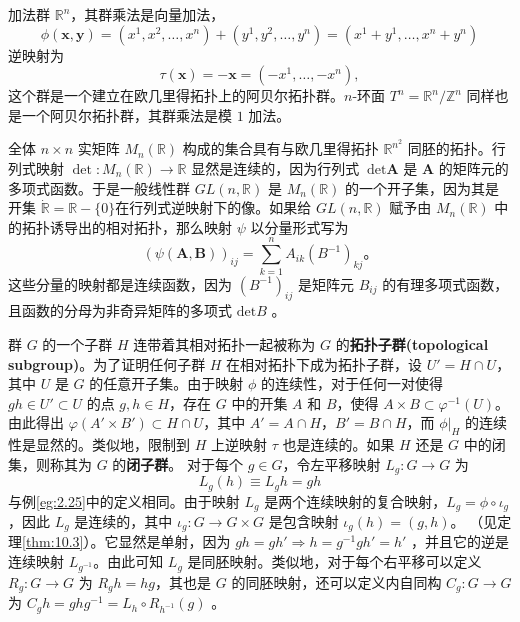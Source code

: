 \begin{theorem}
\begin{theorem}
\begin{eg}\label{eg:10.20}
加法群 $\mathbb{R}^{n}$，其群乘法是向量加法，
\begin{equation*}
    \phi (\mathbf{x} ,\mathbf{y}) =(x^{1} ,x^{2} ,\dotsc ,x^{n} )+(y^{1} ,y^{2} ,\dotsc ,y^{n} )=(x^{1} +y^{1} ,\dotsc ,x^{n} +y^{n} )
\end{equation*}
逆映射为
\begin{equation*}
    \tau (\mathbf{x} )=-\mathbf{x} =(-x^{1} ,\dotsc ,-x^{n} ),
\end{equation*}
这个群是一个建立在欧几里得拓扑上的阿贝尔拓扑群。$n$-环面 $T^{n} =\mathbb{R}^{n} /\mathbb{Z}^{n}$ 同样也是一个阿贝尔拓扑群，其群乘法是模 $ 1$ 加法。
\end{eg}

\begin{eg}\label{eg:10.20}
全体 $n\times n$ 实矩阵 $M_{n} (\mathbb{R} )$ 构成的集合具有与欧几里得拓扑 $\mathbb{R}^{n^{2}}$ 同胚的拓扑。行列式映射 $\det :M_{n} (\mathbb{R} )\rightarrow \mathbb{R}$ 显然是连续的，因为行列式 $ \ \mathrm{det}\mathbf{A}$ 是 $ \mathbf{A}$ 的矩阵元的多项式函数。于是一般线性群 $GL(n,\mathbb{R} )$ 是 $M_{n} (\mathbb{R} )$ 的一个开子集，因为其是开集 $\dot{\mathbb{R}} =\mathbb{R} -\{0\}$在行列式逆映射下的像。如果给 $GL(n,\mathbb{R} )$ 赋予由 $M_{n} (\mathbb{R} )$ 中的拓扑诱导出的相对拓扑，那么映射 $\psi $ 以分量形式写为
\begin{equation*}
    ( \psi (\mathbf{A} ,\mathbf{B} ))_{ij} =\sum _{k=1}^{n} A_{ik}\left( B^{-1}\right)_{kj} 。
\end{equation*}
这些分量的映射都是连续函数，因为 $(B^{-1} )_{ij}$ 是矩阵元 $B_{ij}$ 的有理多项式函数，且函数的分母为非奇异矩阵的多项式 $ \mathrm{det} B$ 。
\end{eg}

	群 $G$ 的一个子群 $H$ 连带着其相对拓扑一起被称为 $G$ 的\textbf{拓扑子群(topological subgroup)}。为了证明任何子群 $H$ 在相对拓扑下成为拓扑子群，设 $U'=H\cap U$，其中 $U$ 是 $G$ 的任意开子集。由于映射 $\phi $ 的连续性，对于任何一对使得 $gh\in U'\subset U$ 的点 $g,h\in H$，存在 $G$ 中的开集 $A$ 和 $B$，使得 $A\times B\subset \varphi ^{-1} (U)$。由此得出 $\varphi (A'\times B')\subset H\cap U$，其中 $A'=A\cap H$，$B'=B\cap H$，而 $ \phi |_{H}$ 的连续性是显然的。类似地，限制到 $H$ 上逆映射 $\tau $ 也是连续的。如果 $H$ 还是 $G$ 中的闭集，则称其为 $G$ 的\textbf{闭子群}。
	对于每个 $g\in G$，令左平移映射 $L_{g} :G\rightarrow G$ 为
\begin{equation*}
    L_{g} (h)\equiv L_{g} h=gh
\end{equation*}
与例\ref{eg:2.25}中的定义相同。由于映射 $L_{g}$ 是两个连续映射的复合映射，$L_{g} =\phi \circ \iota _{g}$，因此 $L_{g}$ 是连续的，其中 $\iota _{g} :G\rightarrow G\times G$ 是包含映射 $\iota _{g} (h)=(g,h)$。
（见定理\ref{thm:10.3}）。它显然是单射，因为 $gh=gh'\Longrightarrow h=g^{-1} gh'=h'$ ，并且它的逆是连续映射 $L_{g^{-1}}$。由此可知 $L_{g}$ 是同胚映射。类似地，对于每个右平移可以定义 $R_{g} :G\rightarrow G$ 为 $R_{g} h=hg$，其也是 $G$ 的同胚映射，还可以定义内自同构 $C_{g} :G\rightarrow G$ 为 $C_{g} h=ghg^{-1} =L_{h} \circ R_{h^{-1}}( g)$ 。


\end{theorem}
\end{theorem}
